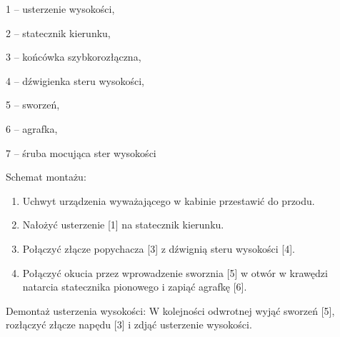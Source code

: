 \documentclass{article}
\newenvironment{packed_enum}{
\begin{enumerate}
  \setlength{\itemsep}{1pt}
  \setlength{\parskip}{0pt}
  \setlength{\parsep}{0pt}
}{\end{enumerate}}
\begin{document}
\begin{packed_enum}
\item[1] -- usterzenie wysokości,
\item[2] -- statecznik kierunku,
\item[3] -- końcówka szybkorozłączna,
\item[4] -- dźwigienka steru wysokości,
\item[5] -- sworzeń,
\item[6] -- agrafka,
\item[7] -- śruba mocująca ster wysokości
\end{packed_enum}

\noindent
Schemat montażu:
\begin{enumerate}
\item Uchwyt urządzenia wyważającego w kabinie przestawić do przodu.
\item Nałożyć usterzenie [1] na statecznik kierunku.
\item Połączyć złącze popychacza [3] z dźwignią steru wysokości [4].
\item Połączyć okucia przez wprowadzenie sworznia [5] w otwór w krawędzi
    natarcia statecznika pionowego i zapiąć agrafkę [6].
\end{enumerate}

\noindent
Demontaż usterzenia wysokości: W kolejności odwrotnej wyjąć sworzeń [5],
rozłączyć złącze napędu [3] i zdjąć usterzenie wysokości.
\end{document}
